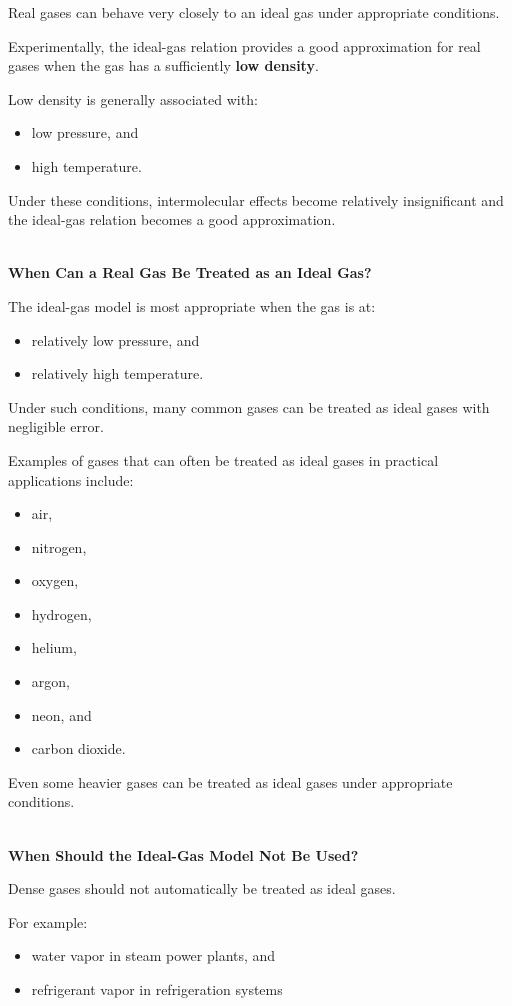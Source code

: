 \documentclass[12pt]{article}
\begin{document}
Real gases can behave very closely to an ideal gas under appropriate conditions.

Experimentally, the ideal-gas relation provides a good approximation for real gases when the gas has a sufficiently \textbf{low density}.

Low density is generally associated with:
\begin{itemize}
    \item low pressure, and
    \item high temperature.
\end{itemize}

Under these conditions, intermolecular effects become relatively insignificant and the ideal-gas relation becomes a good approximation.

\textbf{\\ When Can a Real Gas Be Treated as an Ideal Gas?}

The ideal-gas model is most appropriate when the gas is at:
\begin{itemize}
    \item relatively low pressure, and
    \item relatively high temperature.
\end{itemize}

Under such conditions, many common gases can be treated as ideal gases with negligible error.

Examples of gases that can often be treated as ideal gases in practical applications include:
\begin{itemize}
    \item air,
    \item nitrogen,
    \item oxygen,
    \item hydrogen,
    \item helium,
    \item argon,
    \item neon, and
    \item carbon dioxide.
\end{itemize}

Even some heavier gases can be treated as ideal gases under appropriate conditions.

\textbf{\\ When Should the Ideal-Gas Model Not Be Used?}

Dense gases should not automatically be treated as ideal gases.

For example:
\begin{itemize}
    \item water vapor in steam power plants, and
    \item refrigerant vapor in refrigeration systems
\end{itemize}
\end{document}
